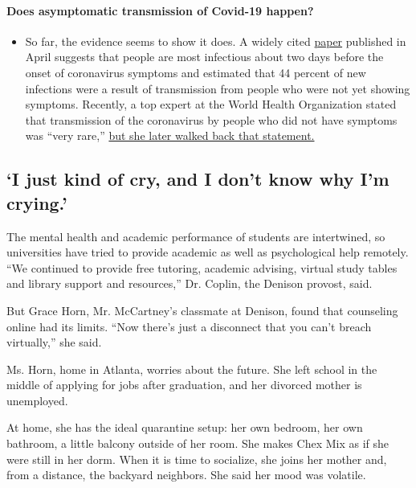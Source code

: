\begin{itemize}
{  \paragraph{Does asymptomatic transmission of Covid-19
  happen?}\label{does-asymptomatic-transmission-of-covid-19-happen}}

  \begin{itemize}
  \tightlist
  \item
    So far, the evidence seems to show it does. A widely cited
    \href{https://www.nature.com/articles/s41591-020-0869-5}{paper}
    published in April suggests that people are most infectious about
    two days before the onset of coronavirus symptoms and estimated that
    44 percent of new infections were a result of transmission from
    people who were not yet showing symptoms. Recently, a top expert at
    the World Health Organization stated that transmission of the
    coronavirus by people who did not have symptoms was ``very rare,''
    \href{https://www.nytimes.com/2020/06/09/world/coronavirus-updates.html?action=click\&pgtype=Article\&state=default\&region=MAIN_CONTENT_3\&context=storylines_faq\#link-1f302e21}{but
    she later walked back that statement.}
  \end{itemize}
\end{itemize}

\hypertarget{i-just-kind-of-cry-and-i-dont-know-why-im-crying}{%
\subsection{`I just kind of cry, and I don't know why I'm
crying.'}\label{i-just-kind-of-cry-and-i-dont-know-why-im-crying}}

The mental health and academic performance of students are intertwined,
so universities have tried to provide academic as well as psychological
help remotely. ``We continued to provide free tutoring, academic
advising, virtual study tables and library support and resources,'' Dr.
Coplin, the Denison provost, said.

But Grace Horn, Mr. McCartney's classmate at Denison, found that
counseling online had its limits. ``Now there's just a disconnect that
you can't breach virtually,'' she said.

Ms. Horn, home in Atlanta, worries about the future. She left school in
the middle of applying for jobs after graduation, and her divorced
mother is unemployed.

At home, she has the ideal quarantine setup: her own bedroom, her own
bathroom, a little balcony outside of her room. She makes Chex Mix as if
she were still in her dorm. When it is time to socialize, she joins her
mother and, from a distance, the backyard neighbors. She said her mood
was volatile.

